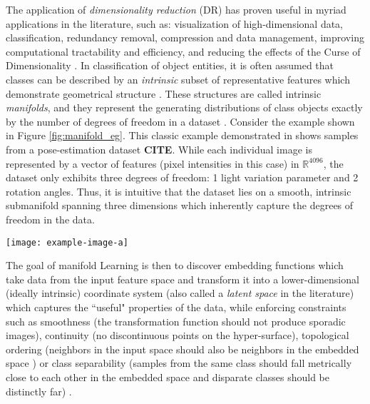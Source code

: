 The application of \textit{dimensionality reduction} (DR) has proven useful in myriad applications in the literature, such as: visualization of high-dimensional data, classification, redundancy removal, compression and data management, improving computational tractability and efficiency, and reducing the effects of the Curse of Dimensionality \citep{Bishop1998GTM,Nickel2017PoincareEmbeddings,Talmon2015ManifoldLearningInDynamicalSystems,Tenenbaum2000Isomap, Geng2005SupNonlinearDimRed, Palomo2017GHNG, Kohonen1990SOM,Kegl2008PrincipalManifoldsTextbook,Bengio2014RepLearningReview}.  In classification of object entities, it is often assumed that classes can be described by an \textit{intrinsic} subset of representative features which demonstrate geometrical structure \citep{Belkin2006ManReg}. These structures are called intrinsic \textit{manifolds}, and they represent the generating distributions of class objects exactly by the number of degrees of freedom in a dataset \citep{Thorstensen2009ManifoldThesis, Belkin2004SemiSupLearningRiemannianManifolds}.     Consider the example shown in Figure \ref{fig:manifold_eg}.  This classic example demonstrated in \citep{Thorstensen2009ManifoldThesis} shows samples from a pose-estimation dataset \textbf{CITE}.  While each individual image is represented by a vector of features (pixel intensities in this case) in $\mathbb{R}^{4096}$, the dataset only exhibits three degrees of freedom: 1 light variation parameter and 2 rotation angles.  Thus, it is intuitive that the dataset lies on a smooth, intrinsic submanifold spanning three dimensions which inherently capture the degrees of freedom in the data.

\begin{center}
	\begin{figure*}[h]
		\centering
		\texttt{[image: example-image-a]}
		\caption[Example pose data manifold.]{Placeholder for example of high D data lying on a low-dimensional sub-manifold.}
		\label{fig:manifold_eg}
	\end{figure*}
\end{center}

The goal of manifold Learning is then to discover embedding functions which take data from the input feature space and transform it into a lower-dimensional (ideally intrinsic) coordinate system (also called a \textit{latent space} in the literature) which captures the ``useful" properties of the data, while enforcing constraints such as smoothness (the transformation function should not produce sporadic images), continuity (no discontinuous points on the hyper-surface), topological ordering (neighbors in the input space should also be neighbors in the embedded space ) or class separability (samples from the same class should fall metrically close to each other in the embedded space and disparate classes should be distinctly far) \citep{Vural2018StudySupervisedManifoldLearning}.

